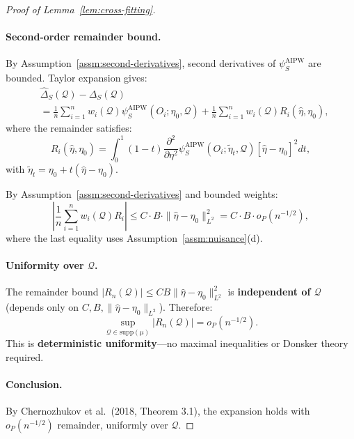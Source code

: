 \begin{proof}[Proof of Lemma~\ref{lem:cross-fitting}]
\paragraph{Second-order remainder bound.}
By Assumption~\ref{assm:second-derivatives}, second derivatives of $\psi_S^{\text{AIPW}}$ are bounded. Taylor expansion gives:
\begin{align}
&\hat{\Delta}_S(\mathcal{Q}) - \Delta_S(\mathcal{Q}) \\
&= \frac{1}{n}\sum_{i=1}^n w_i(\mathcal{Q}) \psi_S^{\text{AIPW}}(O_i; \eta_0, \mathcal{Q}) + \frac{1}{n}\sum_{i=1}^n w_i(\mathcal{Q}) R_i(\hat{\eta}, \eta_0),
\end{align}
where the remainder satisfies:
\begin{equation}
R_i(\hat{\eta}, \eta_0) = \int_0^1 (1-t) \frac{\partial^2}{\partial\eta^2}\psi_S^{\text{AIPW}}(O_i; \tilde{\eta}_t, \mathcal{Q})[\hat{\eta} - \eta_0]^2 dt,
\end{equation}
with $\tilde{\eta}_t = \eta_0 + t(\hat{\eta} - \eta_0)$.

By Assumption~\ref{assm:second-derivatives} and bounded weights:
\begin{equation}
\left|\frac{1}{n}\sum_{i=1}^n w_i(\mathcal{Q}) R_i\right| \leq C \cdot B \cdot \|\hat{\eta} - \eta_0\|_{L^2}^2 = C \cdot B \cdot o_P(n^{-1/2}),
\end{equation}
where the last equality uses Assumption~\ref{assm:nuisance}(d).

\paragraph{Uniformity over $\mathcal{Q}$.}
The remainder bound $|R_n(\mathcal{Q})| \leq CB\|\hat{\eta} - \eta_0\|_{L^2}^2$ is \textbf{independent of $\mathcal{Q}$} (depends only on $C, B, \|\hat{\eta} - \eta_0\|_{L^2}$). Therefore:
\begin{equation}
\sup_{\mathcal{Q} \in \text{supp}(\mu)} |R_n(\mathcal{Q})| = o_P(n^{-1/2}).
\end{equation}
This is \textbf{deterministic uniformity}—no maximal inequalities or Donsker theory required.

\paragraph{Conclusion.}
By Chernozhukov et al.\ (2018, Theorem 3.1), the expansion holds with $o_P(n^{-1/2})$ remainder, uniformly over $\mathcal{Q}$.
\end{proof}


